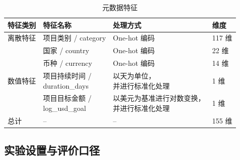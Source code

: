 \begin{table}[H]
\centering
\caption{元数据特征}
\label{tab:exp4_1}
\begin{tabular}{@{}p{1.8cm}p{4.0cm}p{6.0cm}p{1.3cm}@{}}
\toprule
\textbf{特征类别} & \textbf{特征名称} & \textbf{处理方式} & \textbf{维度} \\ \midrule
离散特征 & 项目类别 / category & One-hot 编码 & 117 维 \\
 & 国家 / country & One-hot 编码 & 22 维 \\
 & 币种 / currency & One-hot 编码 & 14 维 \\
数值特征 & \makecell[l]{\rule{0pt}{5.2ex}项目持续时间 /\\ duration\_days} & \makecell[l]{以天为单位，\\并进行标准化处理} & 1 维 \\
 & \makecell[l]{\rule{0pt}{5.2ex}项目目标金额 /\\ log\_usd\_goal} & \makecell[l]{以美元为基准进行对数变换，\\并进行标准化处理} & 1 维 \\
总计 & -- & -- & 155 维 \\ \bottomrule
\end{tabular}
\end{table}


\subsection{实验设置与评价口径}
